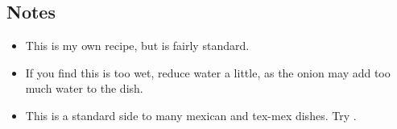 \begin{multicols}{2}
\subsection*{Notes}
\begin{itemize}
    \item This is my own recipe, but is fairly standard.
    \item If you find this is too wet, reduce water a little, as the onion may add too much water to the dish.
    \item This is a standard side to many mexican and tex-mex dishes. Try .
\end{itemize}
\end{multicols}
\clearpage